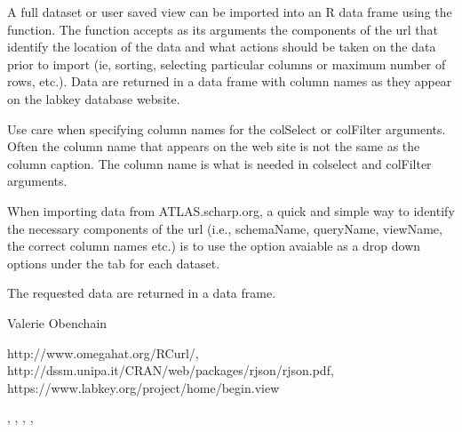 \begin{Details}\relax
A full dataset or user saved view can be imported into an R data frame using the  
function. The function accepts as its arguments the components of the url that identify
the location of the data and what actions should be taken on the data prior to import
(ie, sorting, selecting particular columns or maximum number of rows, etc.). Data are returned in a data 
frame with column names as they appear on the labkey database website. 

Use care when specifying column names for the colSelect or colFilter arguments. Often the column name
that appears on the web site is not the same as the column caption. The column name is what is needed in
colselect and colFilter arguments. 

When importing data from ATLAS.scharp.org, a quick and simple way to identify the necessary components of the url 
(i.e., schemaName, queryName, viewName, the correct column names etc.) is to use the 
option avaiable as a drop down options under the  tab for each dataset.
\end{Details}
\begin{Value}
The requested data are returned in a data frame.
\end{Value}
\begin{Author}\relax
Valerie Obenchain
\end{Author}
\begin{References}\relax
http://www.omegahat.org/RCurl/,\\ 
http://dssm.unipa.it/CRAN/web/packages/rjson/rjson.pdf,\\
https://www.labkey.org/project/home/begin.view
\end{References}
\begin{SeeAlso}\relax
{}, , , 
, 
\end{SeeAlso}
